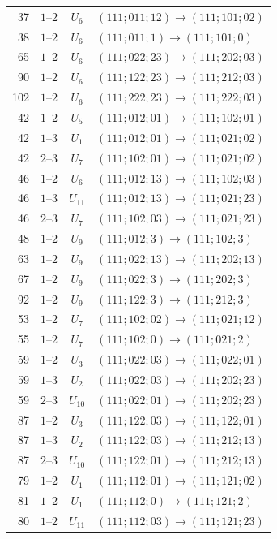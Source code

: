 \begin{longtable}{@{}r c c p{10.3cm}@{}}
37 & $1$--$2$ & $U_6$ & $(111;011;12)\longrightarrow(111;101;02)$\\
38 & $1$--$2$ & $U_6$ & $(111;011;1)\longrightarrow(111;101;0)$\\
65 & $1$--$2$ & $U_6$ & $(111;022;23)\longrightarrow(111;202;03)$\\
90 & $1$--$2$ & $U_6$ & $(111;122;23)\longrightarrow(111;212;03)$\\
102 & $1$--$2$ & $U_6$ & $(111;222;23)\longrightarrow(111;222;03)$\\
42 & $1$--$2$ & $U_5$ & $(111;012;01)\longrightarrow(111;102;01)$\\
42 & $1$--$3$ & $U_1$ & $(111;012;01)\longrightarrow(111;021;02)$\\
42 & $2$--$3$ & $U_7$ & $(111;102;01)\longrightarrow(111;021;02)$\\
46 & $1$--$2$ & $U_6$ & $(111;012;13)\longrightarrow(111;102;03)$\\
46 & $1$--$3$ & $U_{11}$ & $(111;012;13)\longrightarrow(111;021;23)$\\
46 & $2$--$3$ & $U_7$ & $(111;102;03)\longrightarrow(111;021;23)$\\
48 & $1$--$2$ & $U_9$ & $(111;012;3)\longrightarrow(111;102;3)$\\
63 & $1$--$2$ & $U_9$ & $(111;022;13)\longrightarrow(111;202;13)$\\
67 & $1$--$2$ & $U_9$ & $(111;022;3)\longrightarrow(111;202;3)$\\
92 & $1$--$2$ & $U_9$ & $(111;122;3)\longrightarrow(111;212;3)$\\
53 & $1$--$2$ & $U_7$ & $(111;102;02)\longrightarrow(111;021;12)$\\
55 & $1$--$2$ & $U_7$ & $(111;102;0)\longrightarrow(111;021;2)$\\
59 & $1$--$2$ & $U_3$ & $(111;022;03)\longrightarrow(111;022;01)$\\
59 & $1$--$3$ & $U_2$ & $(111;022;03)\longrightarrow(111;202;23)$\\
59 & $2$--$3$ & $U_{10}$ & $(111;022;01)\longrightarrow(111;202;23)$\\
87 & $1$--$2$ & $U_3$ & $(111;122;03)\longrightarrow(111;122;01)$\\
87 & $1$--$3$ & $U_2$ & $(111;122;03)\longrightarrow(111;212;13)$\\
87 & $2$--$3$ & $U_{10}$ & $(111;122;01)\longrightarrow(111;212;13)$\\
79 & $1$--$2$ & $U_1$ & $(111;112;01)\longrightarrow(111;121;02)$\\
81 & $1$--$2$ & $U_1$ & $(111;112;0)\longrightarrow(111;121;2)$\\
80 & $1$--$2$ & $U_{11}$ & $(111;112;03)\longrightarrow(111;121;23)$\\
\end{longtable}
